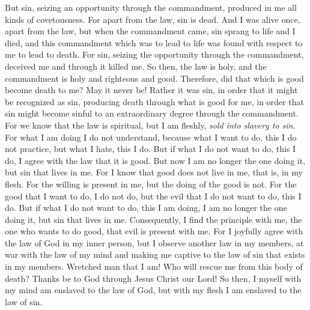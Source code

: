 \begin{biblechapter}
\verse But sin, seizing an opportunity through the commandment, produced in me all kinds of covetousness. For apart from the law, sin is dead.
\verse And I was alive once, apart from the law, but when the commandment came, sin sprang to life
\verse and I died, and this commandment which was to lead to life was found with respect to me to lead to death.
\verse For sin, seizing the opportunity through the commandment, deceived me and through it killed me.
\verse So then, the law is holy, and the commandment is holy and righteous and good.
 Therefore, did that which is good become death to me? May it never be! Rather it was sin, in order that it might be recognized as sin, producing death through what is good for me, in order that sin might become sinful to an extraordinary degree through the commandment.
\verse For we know that the law is spiritual, but I am fleshly, \textit{sold into slavery to sin}.
\verse For what I am doing I do not understand, because what I want to do, this I do not practice, but what I hate, this I do.
\verse But if what I do not want to do, this I do, I agree with the law that it is good.
\verse But now I am no longer the one doing it, but sin that lives in me.
\verse For I know that good does not live in me, that is, in my flesh. For the willing is present in me, but the doing of the good is not.
\verse For the good that I want to do, I do not do, but the evil that I do not want to do, this I do.
\verse But if what I do not want to do, this I am doing, I am no longer the one doing it, but sin that lives in me.
\verse Consequently, I find the principle with me, the one who wants to do good, that evil is present with me.
\verse For I joyfully agree with the law of God in my inner person,
\verse but I observe another law in my members, at war with the law of my mind and making me captive to the law of sin that exists in my members.
\verse Wretched man that I am! Who will rescue me from this body of death?
\verse Thanks be to God through Jesus Christ our Lord! So then, I myself with my mind am enslaved to the law of God, but with my flesh I am enslaved to the law of sin.
\end{biblechapter}


